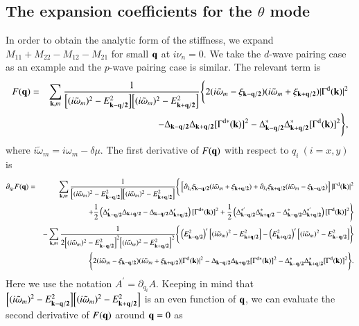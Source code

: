 \documentclass[aps,prd,amsmath,two column,nofootinbib,amssymb,referee]{revtex4}
\begin{document}
\appendix
\begin{widetext}
\section{The expansion coefficients for the $\theta$ mode}\label{rho}
In order to obtain the analytic form of the stiffness, we expand $M_{11}+M_{22}-M_{12}-M_{21}$ for small ${\bf q}$ at $i\nu_n=0$. We take the $d$-wave pairing case as an example and the $p$-wave pairing case is similar. The relevant term is
\begin{eqnarray}
F({\bf q})&=&\sum_{{\bf k},m}{1\over\Big[(i\tilde\omega_m)^2-E_{\bf k-q/2}^2\Big]\Big[(i\tilde\omega_m)^2-E_{\bf k+q/2}^2\Big]}\Bigg\{2(i\tilde\omega_m-\xi_{\bf k-q/2})(i\tilde\omega_m+\xi_{\bf k+q/2})
|\Gamma^{\rm d}({\bf k})|^2\nonumber\\
&&-\Delta_{\bf k-q/2}\Delta_{\bf k+q/2}[\Gamma^{\rm d*}({\bf k})]^2-\Delta_{\bf k-q/2}^*\Delta_{\bf k+q/2}^*[\Gamma^{\rm d}({\bf k})]^2\Bigg\},
\end{eqnarray}
where $i\tilde\omega_m=i\omega_m-\delta\mu$. The first derivative of $F({\bf q})$ with respect to $q_i\ (i=x,y)$ is
\begin{eqnarray}
\partial_{q_i}F({\bf q})&=&\sum_{{\bf k},m}{1\over\Big[(i\tilde\omega_m)^2-E_{\bf k-q/2}^2\Big]\Big[(i\tilde\omega_m)^2-E_{\bf k+q/2}^2\Big]}\Bigg\{\left[\partial_{k_i}\xi_{\bf k-q/2}(i\tilde\omega_m+\xi_{\bf k+q/2})+\partial_{k_i}\xi_{\bf k+q/2}(i\tilde\omega_m-\xi_{\bf k-q/2})\right]|\Gamma^{\rm d}({\bf k})|^2\nonumber\\
&&+{1\over2}\left(\Delta_{\bf k-q/2}'\Delta_{\bf k+q/2}-\Delta_{\bf k-q/2}\Delta_{\bf k+q/2}'\right)[\Gamma^{{\rm d}*}({\bf k})]^2+{1\over2}\left(\Delta_{\bf k-q/2}^{*'}\Delta_{\bf k+q/2}^*
-\Delta_{\bf k-q/2}^{*}\Delta_{\bf k+q/2}^{*'}\right)[\Gamma^{\rm d}({\bf k})]^2\Bigg\}\nonumber\\
&&-\sum_{{\bf k},m}{1\over2\Big[(i\tilde\omega_m)^2-E_{\bf k-q/2}^2\Big]^2\Big[(i\tilde\omega_m)^2-E_{\bf k+q/2}^2\Big]^2}\Bigg\{\left(E_{\bf k-q/2}^2\right)'\Big[(i\tilde\omega_m)^2-E_{\bf k+q/2}^2\Big]
-\left(E_{\bf k+q/2}^2\right)'\Big[(i\tilde\omega_m)^2-E_{\bf k-q/2}^2\Big]\Bigg\}\nonumber\\
&&\Bigg\{2(i\tilde\omega_m-\xi_{\bf k-q/2})(i\tilde\omega_m+\xi_{\bf k+q/2})|\Gamma^{\rm d}({\bf k})|^2-\Delta_{\bf k-q/2}\Delta_{\bf k+q/2}[\Gamma^{{\rm d}*}({\bf k})]^2
-\Delta_{\bf k-q/2}^*\Delta_{\bf k+q/2}^*[\Gamma^{\rm d}({\bf k})]^2\Bigg\}.
\end{eqnarray}
Here we use the notation $A^\prime=\partial_{q_i}A$. Keeping in mind that $\Big[(i\tilde\omega_m)^2-E_{\bf k-q/2}^2\Big]\Big[(i\tilde\omega_m)^2-E_{\bf k+q/2}^2\Big]$ is an even function of ${\bf q}$, we can evaluate the second derivative of $F({\bf q})$ around ${\bf q}=0$ as

\end{widetext}
\end{document}
